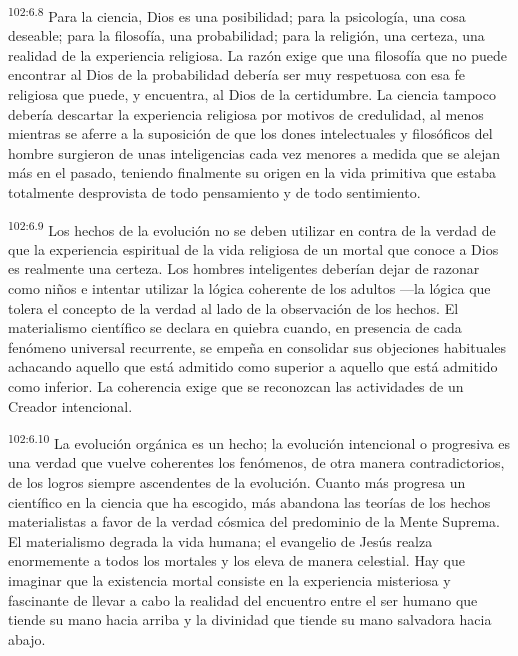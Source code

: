 \par
\textsuperscript{102:6.8} Para la ciencia, Dios es una posibilidad; para la psicología, una cosa deseable; para la filosofía, una probabilidad; para la religión, una certeza, una realidad de la experiencia religiosa. La razón exige que una filosofía que no puede encontrar al Dios de la probabilidad debería ser muy respetuosa con esa fe religiosa que puede, y encuentra, al Dios de la certidumbre. La ciencia tampoco debería descartar la experiencia religiosa por motivos de credulidad, al menos mientras se aferre a la suposición de que los dones intelectuales y filosóficos del hombre surgieron de unas inteligencias cada vez menores a medida que se alejan más en el pasado, teniendo finalmente su origen en la vida primitiva que estaba totalmente desprovista de todo pensamiento y de todo sentimiento.

\par
\textsuperscript{102:6.9} Los hechos de la evolución no se deben utilizar en contra de la verdad de que la experiencia espiritual de la vida religiosa de un mortal que conoce a Dios es realmente una certeza. Los hombres inteligentes deberían dejar de razonar como niños e intentar utilizar la lógica coherente de los adultos ---la lógica que tolera el concepto de la verdad al lado de la observación de los hechos. El materialismo científico se declara en quiebra cuando, en presencia de cada fenómeno universal recurrente, se empeña en consolidar sus objeciones habituales achacando aquello que está admitido como superior a aquello que está admitido como inferior. La coherencia exige que se reconozcan las actividades de un Creador intencional.

\par
\textsuperscript{102:6.10} La evolución orgánica es un hecho; la evolución intencional o progresiva es una verdad que vuelve coherentes los fenómenos, de otra manera contradictorios, de los logros siempre ascendentes de la evolución. Cuanto más progresa un científico en la ciencia que ha escogido, más abandona las teorías de los hechos materialistas a favor de la verdad cósmica del predominio de la Mente Suprema. El materialismo degrada la vida humana; el evangelio de Jesús realza enormemente a todos los mortales y los eleva de manera celestial. Hay que imaginar que la existencia mortal consiste en la experiencia misteriosa y fascinante de llevar a cabo la realidad del encuentro entre el ser humano que tiende su mano hacia arriba y la divinidad que tiende su mano salvadora hacia abajo.

